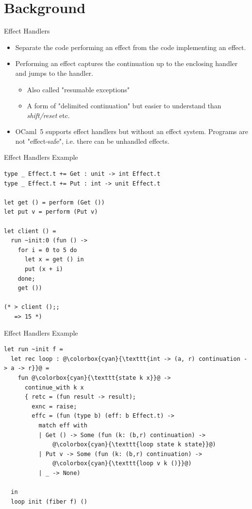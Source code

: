 \documentclass[aspectratio=43]{beamer}
\newcommand{\ocf}{OCaml~5}
\begin{document}
\section{Background}

\begin{frame}[fragile]{Effect Handlers}
    \begin{itemize}
        \item Separate the code performing an effect from the code implementing an effect.
        \item Performing an effect captures the continuation up to the enclosing handler and jumps to the handler.
              \begin{itemize}
                  \item Also called "resumable exceptions"
                  \item A form of "delimited continuation" but easier to understand than \textit{shift/reset} etc.
              \end{itemize}
        \item \ocf{} supports effect handlers but without an effect system. Programs are not "effect-safe", i.e. there can be unhandled effects.
    \end{itemize}
\end{frame}


\begin{frame}[fragile]{Effect Handlers Example}
    \begin{verbatim}
type _ Effect.t += Get : unit -> int Effect.t
type _ Effect.t += Put : int -> unit Effect.t

let get () = perform (Get ())
let put v = perform (Put v)

let client () = 
  run ~init:0 (fun () ->
    for i = 0 to 5 do
      let x = get () in
      put (x + i)
    done;
    get ())

(* > client ();;
   => 15 *)
\end{verbatim}
\end{frame}

\begin{frame}[fragile]{Effect Handlers Example}
    \begin{verbatim}
let run ~init f =
  let rec loop : @\colorbox{cyan}{\texttt{int -> (a, r) continuation -> a -> r}}@ =
    fun @\colorbox{cyan}{\texttt{state k x}}@ ->
      continue_with k x
      { retc = (fun result -> result);
        exnc = raise;
        effc = (fun (type b) (eff: b Effect.t) ->
          match eff with
          | Get () -> Some (fun (k: (b,r) continuation) ->
              @\colorbox{cyan}{\texttt{loop state k state}}@)
          | Put v -> Some (fun (k: (b,r) continuation) ->
              @\colorbox{cyan}{\texttt{loop v k ()}}@)
          | _ -> None)
      
  in
  loop init (fiber f) ()
\end{verbatim}
\end{frame}
\end{document}
